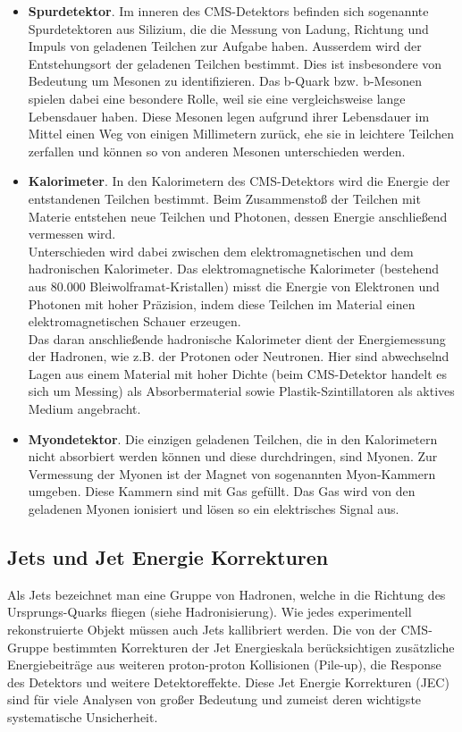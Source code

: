 \begin{itemize}
\item \textbf{Spurdetektor}. Im inneren des CMS-Detektors befinden sich sogenannte Spurdetektoren aus Silizium, die die Messung von Ladung, Richtung und Impuls von geladenen Teilchen zur Aufgabe haben. Ausserdem wird der Entstehungsort der geladenen Teilchen bestimmt. Dies ist insbesondere von Bedeutung um Mesonen zu identifizieren. Das b-Quark bzw. b-Mesonen spielen dabei eine besondere Rolle, weil sie eine vergleichsweise lange Lebensdauer haben. Diese Mesonen legen aufgrund ihrer Lebensdauer im Mittel einen Weg von einigen Millimetern zur\"uck, ehe sie in leichtere Teilchen zerfallen und k\"onnen so von anderen Mesonen unterschieden werden. 
\item \textbf{Kalorimeter}. In den Kalorimetern des CMS-Detektors wird die Energie der entstandenen Teilchen bestimmt. Beim Zusammensto{\ss} der Teilchen mit Materie entstehen neue Teilchen und Photonen, dessen Energie anschlie{\ss}end vermessen wird.\\
Unterschieden wird dabei zwischen dem elektromagnetischen und dem hadronischen Kalorimeter. Das elektromagnetische Kalorimeter (bestehend aus 80.000 Bleiwolframat-Kristallen) misst die Energie von Elektronen und Photonen mit hoher Pr\"azision, indem diese Teilchen im Material einen elektromagnetischen Schauer erzeugen.\\
Das daran anschlie{\ss}ende hadronische Kalorimeter dient der Energiemessung der Hadronen, wie z.B. der Protonen oder Neutronen. Hier sind abwechselnd Lagen aus einem Material mit hoher Dichte (beim CMS-Detektor handelt es sich um Messing) als Absorbermaterial sowie Plastik-Szintillatoren als aktives Medium angebracht. 
\item \textbf{Myondetektor}. Die einzigen geladenen Teilchen, die in den Kalorimetern nicht absorbiert werden k\"onnen und diese durchdringen, sind Myonen. Zur Vermessung der Myonen ist der Magnet von sogenannten Myon-Kammern umgeben. Diese Kammern sind mit Gas gef\"ullt. Das Gas wird von den geladenen Myonen ionisiert und l\"osen so ein elektrisches Signal aus.
\end{itemize}

\subsection{Jets und Jet Energie Korrekturen} 
Als Jets bezeichnet man eine Gruppe von Hadronen, welche in die Richtung des Ursprungs-Quarks fliegen (siehe Hadronisierung). Wie jedes experimentell rekonstruierte Objekt m\"ussen auch Jets kallibriert werden. Die von der CMS-Gruppe bestimmten Korrekturen der Jet Energieskala ber\"ucksichtigen zusätzliche Energiebeitr\"age aus weiteren proton-proton Kollisionen (Pile-up), die Response des Detektors und weitere Detektoreffekte. Diese Jet Energie Korrekturen (JEC) sind f\"ur viele Analysen von gro\ss{}er Bedeutung und zumeist deren wichtigste systematische Unsicherheit.  

